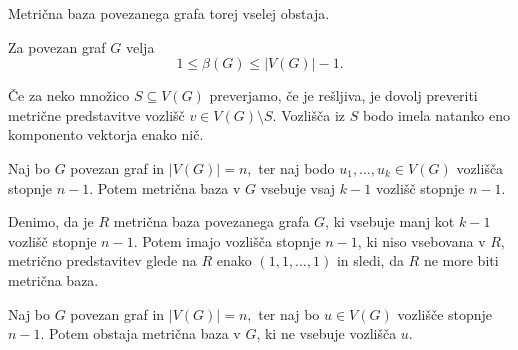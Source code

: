 \documentclass[mat1, tisk]{fmfdelo}
\newcommand{\1}{(1, 1, \ldots, 1)}
\newcommand{\2}{(2, 2, \ldots, 2)}
\begin{document}
Metrična baza povezanega grafa torej vselej obstaja.

\begin{posledica} \label{po:groba_omejitev_mdim}
    Za povezan graf $G$ velja 
    $$1 \leq \beta(G) \leq |V(G)| - 1. $$
\end{posledica}

\begin{opomba} \label{op:zadostno_preverjanje}
    Če za neko množico $S \subseteq V(G)$ preverjamo, če je rešljiva, je dovolj preveriti metrične 
    predstavitve vozlišč $v \in V(G) \setminus S.$ Vozlišča iz $S$ bodo imela natanko eno komponento 
    vektorja enako nič. 
\end{opomba}

\begin{lema} \label{lema:vozlisce_max_deg_1}
    Naj bo $G$ povezan graf in $|V(G)| = n,$ ter naj bodo $u_1, \ldots, u_k \in V(G)$ vozlišča stopnje $n-1.$
    Potem metrična baza v $G$ vsebuje vsaj $k-1$ vozlišč stopnje $n-1.$
\end{lema}

\begin{dokaz}
    Denimo, da je $R$ metrična baza povezanega grafa $G$, ki vsebuje manj kot $k-1$ vozlišč stopnje $n-1$. 
    Potem imajo vozlišča stopnje $n-1$, ki niso vsebovana v $R$, metrično predstavitev glede na $R$ enako 
    $\1$ in sledi, da $R$ ne more biti metrična baza. 
\end{dokaz}

\begin{lema} \label{lema:vozlisce_max_deg_2}
    Naj bo $G$ povezan graf in $|V(G)| = n,$ ter naj bo $u \in V(G)$ vozlišče stopnje $n-1.$
    Potem obstaja metrična baza v $G$, ki ne vsebuje vozlišča $u.$
\end{lema}
\end{document}
